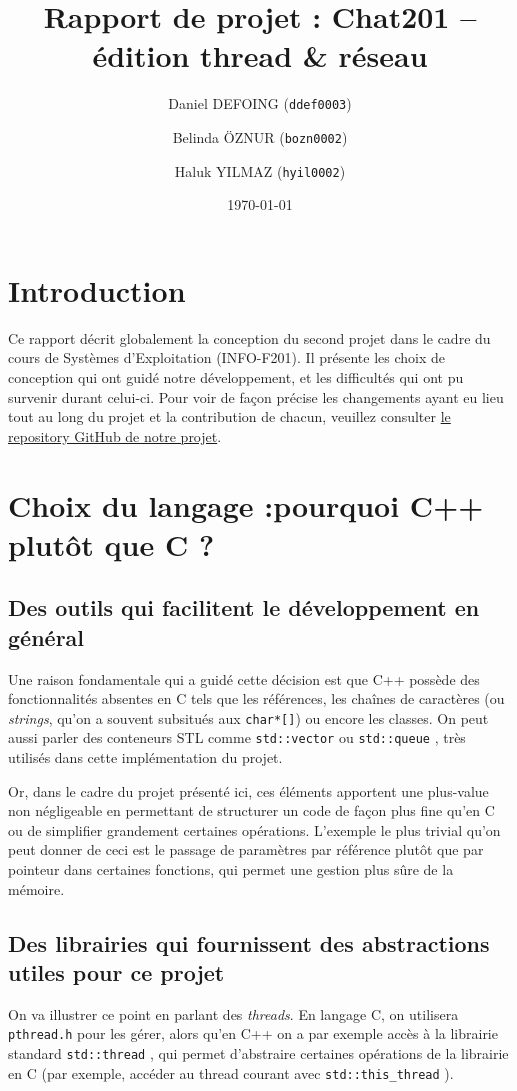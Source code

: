 \documentclass{article}
\title{Rapport de projet : Chat201 – édition thread \& réseau}
\author{Daniel DEFOING (\texttt{ddef0003}) \and 
        Belinda ÖZNUR (\texttt{bozn0002}) \and
        Haluk YILMAZ (\texttt{hyil0002})}
\date{\today}
\begin{document}

\maketitle
\tableofcontents
\newpage

\section{Introduction}
\noindent Ce rapport décrit globalement la conception du second projet dans le cadre du cours de Systèmes d'Exploitation
(INFO-F201). Il présente les choix de conception qui ont guidé notre développement, et les difficultés qui ont pu survenir durant celui-ci. Pour voir de façon précise les changements ayant eu lieu tout au long du projet et la contribution de chacun, veuillez consulter \href{https://github.com/Daniel-Dfg/OS_Projet_2}{le repository GitHub de notre projet}.

\section{Choix du langage :pourquoi C++ plutôt que C ?}

\subsection*{Des outils qui facilitent le développement en général}
\noindent Une raison fondamentale qui a guidé cette décision est que C++ possède des fonctionnalités absentes en C tels que les références, les chaînes de caractères (ou \textit{strings}, qu'on a souvent subsitués aux \texttt{char*[]}) ou encore les classes.
On peut aussi parler des conteneurs STL comme \texttt{std::vector} ou \texttt{std::queue} \cite{std::queue}, très utilisés dans cette implémentation du projet.


\noindent Or, dans le cadre du projet présenté ici, ces éléments apportent une plus-value non négligeable en permettant de structurer un code de façon plus fine qu'en C ou de simplifier grandement certaines opérations. L'exemple le plus trivial qu'on peut donner de ceci est le passage de paramètres par référence plutôt que par pointeur dans certaines fonctions, qui permet une gestion plus sûre de la mémoire.

\subsection*{Des librairies qui fournissent des abstractions utiles pour ce projet}
\noindent On va illustrer ce point en parlant des \textit{threads}. En langage C, on utilisera \texttt{pthread.h} \cite{pthread.h} pour les gérer, alors qu'en C++ on a par exemple accès à la librairie standard \texttt{std::thread} \cite{std::thread}, qui permet d'abstraire certaines opérations de la librairie en C (par exemple, accéder au thread courant avec \texttt{std::this\_thread} \cite{std::thread}).
\end{document}
